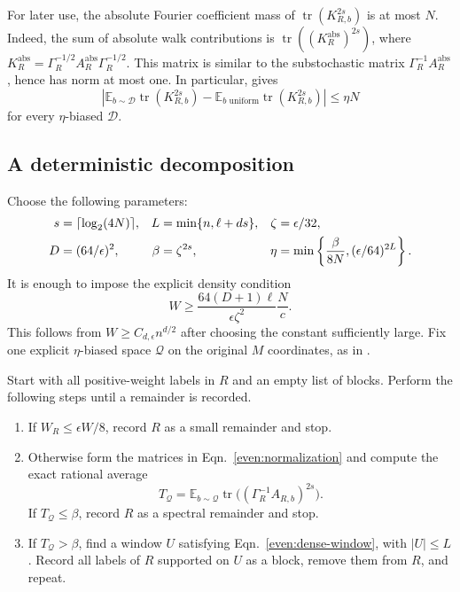 \documentclass[letterpaper,11pt]{article}
\theoremstyle{definition}
\newcommand{\E}{\mathbb E}
\newcommand{\abs}[1]{\left|#1\right|}
\DeclareMathOperator{\tr}{tr}
\begin{document}
For later use, the absolute Fourier coefficient mass of
$\tr(K_{R,b}^{2s})$ is at most $N$.
Indeed, the sum of absolute walk contributions is
$\tr((K_R^{\mathrm{abs}})^{2s})$, where
$K_R^{\mathrm{abs}}=\Gamma_R^{-1/2}A_R^{\mathrm{abs}}\Gamma_R^{-1/2}$.
This matrix is similar to the substochastic matrix
$\Gamma_R^{-1}A_R^{\mathrm{abs}}$, hence has norm at most one.
In particular,  gives
\begin{equation}\label{even:trace-transfer}
 \abs{\E_{b\sim\mathcal D}\tr(K_{R,b}^{2s})
       -\E_{b\text{ uniform}}\tr(K_{R,b}^{2s})}
 \leq\eta N
\end{equation}
for every $\eta$-biased $\mathcal D$.

\subsection{A deterministic decomposition}

Choose the following parameters:
\begin{align}
 s&=\lceil\log_2(4N)\rceil,&
 L&=\min\{n,\ell+ds\},&
 \zeta&=\epsilon/32,\notag\\
 D&=(64/\epsilon)^2,&
 \beta&=\zeta^{2s},&
 \eta&=\min\left\{\frac{\beta}{8N},
                    (\epsilon/64)^{2L}\right\}.
 \label{even:parameters}
\end{align}
It is enough to impose the explicit density condition
\begin{equation}\label{even:density}
 W\geq\frac{64(D+1)\ell}{\epsilon\zeta^2}\frac Nc.
\end{equation}
This follows from $W\geq C_{d,\epsilon}n^{d/2}$ after choosing the
constant sufficiently large. Fix one explicit $\eta$-biased space
$\mathcal Q$ on the original $M$ coordinates, as in
.

Start with all positive-weight labels in $R$ and an empty list of blocks.
Perform the following steps until a remainder is recorded.
\begin{enumerate}
\item If $W_R\leq\epsilon W/8$, record $R$ as a small remainder and stop.
\item Otherwise form the matrices in Eqn.~\eqref{even:normalization}
and compute the exact rational average
\[
 T_{\mathcal Q}=
 \E_{b\sim\mathcal Q}\tr\bigl((\Gamma_R^{-1}A_{R,b})^{2s}\bigr).
\]
If $T_{\mathcal Q}\leq\beta$, record $R$ as a spectral remainder and stop.
\item If $T_{\mathcal Q}>\beta$, find a window $U$ satisfying
Eqn.~\eqref{even:dense-window}, with $\abs U\leq L$.
Record all labels of $R$ supported on $U$ as a block, remove them from
$R$, and repeat.
\end{enumerate}
\end{document}

